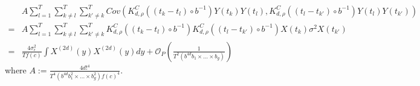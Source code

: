 \begin{equation}
\begin{split}
&A \sum_{l=1}^T \sum_{k \neq l}^T \sum_{k' \neq k }^T  Cov( K_{d,\rho}^{C} \left((t_{k}-t_{l}) \circ b^{-1} \right) Y(t_{k}) Y(t_{l}) , K_{d,\rho}^{C} \left((t_{l}-t_{k'})\circ b^{-1} \right) Y(t_{l}) Y(t_{k'}))\\
=&A \sum_{l=1}^T \sum_{k \neq l}^T \sum_{k' \neq k }^T  K_{d,\rho}^{C} \left((t_{k}-t_{l}) \circ b^{-1} \right)   K_{d,\rho}^{C} \left((t_{l}-t_{k'})\circ b^{-1} \right)   X(t_{k}) \sigma^2 X(t_{k'}) \\
=& \frac{4 \sigma_{\epsilon}^2}{T f(c)} \int  X^{(2d)}(y) X^{(2d)}(y) dy + \mathcal{O}_P \left( \frac{1}{T^2 (b^{4d} b_1 \times \dots \times b_g)} \right)%
\end{split}
\end{equation}
where $A:=\frac{4 d!^4}{T^4 (b^{4d} b_1^2 \times \dots \times b_g^2)f(c)^4} $.

